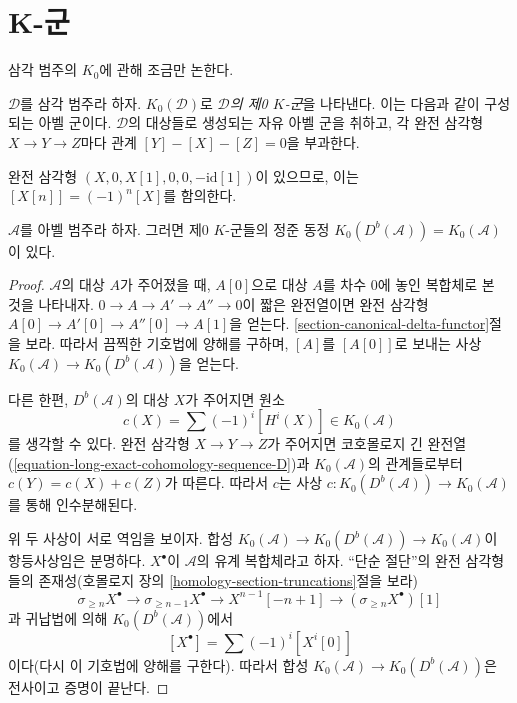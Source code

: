 \section{K-군}
\label{section-K-groups}

\noindent
삼각 범주의 $K_0$에 관해 조금만 논한다.

\begin{definition}
\label{definition-K-zero}
$\mathcal{D}$를 삼각 범주라 하자. $K_0(\mathcal{D})$로
{\it $\mathcal{D}$의 제0 $K$-군}을 나타낸다. 이는 다음과 같이
구성되는 아벨 군이다. $\mathcal{D}$의 대상들로 생성되는 자유 아벨 군을
취하고, 각 완전 삼각형 $X \to Y \to Z$마다 관계
$[Y] - [X] - [Z] = 0$을 부과한다.
\end{definition}

\noindent
완전 삼각형 $(X, 0, X[1], 0, 0, -\text{id}[1])$이 있으므로, 이는
$[X[n]] = (-1)^n[X]$를 함의한다.

\begin{lemma}
\label{lemma-K-bounded-derived}
$\mathcal{A}$를 아벨 범주라 하자. 그러면 제0 $K$-군들의 정준 동정
$K_0(D^b(\mathcal{A})) = K_0(\mathcal{A})$이 있다.
\end{lemma}

\begin{proof}
$\mathcal{A}$의 대상 $A$가 주어졌을 때, $A[0]$으로 대상 $A$를
차수 $0$에 놓인 복합체로 본 것을 나타내자.
$0 \to A \to A' \to A'' \to 0$이 짧은 완전열이면 완전 삼각형
$A[0] \to A'[0] \to A''[0] \to A[1]$을 얻는다.
\ref{section-canonical-delta-functor}절을 보라.
따라서 끔찍한 기호법에 양해를 구하며, $[A]$를 $[A[0]]$로 보내는
사상 $K_0(\mathcal{A}) \to K_0(D^b(\mathcal{A}))$을 얻는다.

\medskip\noindent
다른 한편, $D^b(\mathcal{A})$의 대상 $X$가 주어지면 원소
$$
c(X) = \sum (-1)^i[H^i(X)] \in K_0(\mathcal{A})
$$
를 생각할 수 있다. 완전 삼각형 $X \to Y \to Z$가 주어지면
코호몰로지 긴 완전열
(\ref{equation-long-exact-cohomology-sequence-D})과
$K_0(\mathcal{A})$의 관계들로부터 $c(Y) = c(X) + c(Z)$가 따른다.
따라서 $c$는 사상
$c : K_0(D^b(\mathcal{A})) \to K_0(\mathcal{A})$를 통해 인수분해된다.

\medskip\noindent
위 두 사상이 서로 역임을 보이자. 합성
$K_0(\mathcal{A}) \to
K_0(D^b(\mathcal{A})) \to K_0(\mathcal{A})$이 항등사상임은 분명하다.
$X^\bullet$이 $\mathcal{A}$의 유계 복합체라고 하자.
“단순 절단”의 완전 삼각형들의 존재성(호몰로지 장의
\ref{homology-section-truncations}절을 보라)
$$
\sigma_{\geq n}X^\bullet \to \sigma_{\geq n - 1}X^\bullet \to
X^{n - 1}[-n + 1] \to (\sigma_{\geq n}X^\bullet)[1]
$$
과 귀납법에 의해 $K_0(D^b(\mathcal{A}))$에서
$$
[X^\bullet] = \sum (-1)^i[X^i[0]]
$$
이다(다시 이 기호법에 양해를 구한다). 따라서 합성
$K_0(\mathcal{A}) \to K_0(D^b(\mathcal{A}))$은 전사이고 증명이 끝난다.
\end{proof}

